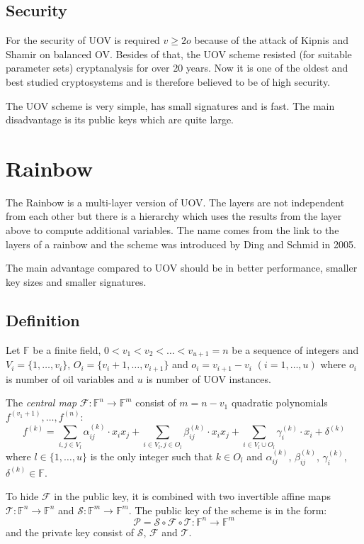 \documentclass[thesis=M,english]{FITthesis}[2019/12/23]
\begin{document}
\subsection{Security}
For the security of UOV is required $v \geq 2o$ because of the attack of Kipnis and Shamir on balanced OV.\cite{L-KS98} Besides of that, the UOV scheme resisted (for suitable parameter sets) cryptanalysis for over 20 years. Now it is one of the oldest and best studied cryptosystems and is therefore believed to be of high security.

The UOV scheme is very simple, has small signatures and is fast. The main disadvantage is its public keys which are quite large.

\newpage
\section{Rainbow}
The Rainbow is a multi-layer version of UOV. The layers are not independent from each other but there is a hierarchy which uses the results from the layer above to compute additional variables. The name comes from the link to the layers of a rainbow and the scheme was introduced by Ding and Schmid in 2005.

The main advantage compared to UOV should be in better performance, smaller key sizes and smaller signatures.

\subsection{Definition}
Let $\mathbb{F}$ be a finite field, $0<v_1<v_2<\ldots<v_{u+1} = n$ be a sequence of integers and $V_i=\{1, \ldots, v_i\}$, $O_i=\{v_i+1, \ldots, v_{i+1}\}$ and $o_i = v_{i+1} - v_i \,\, (i=1,\ldots,u)$ where $o_i$ is number of oil variables and $u$ is number of UOV instances.

\bigskip
\noindent
The \textit{central map} $\mathcal{F}:\mathbb{F}^n \rightarrow \mathbb{F}^m$ consist of $m = n - v_1$ quadratic polynomials $f^{(v_1+1)}, \ldots, f^{(n)}$:
\[
	f^{(k)} = \sum\limits_{i,j \in V_l}{\alpha_{ij}^{(k)} \cdot x_ix_j} +  \sum\limits_{i \in V_l,j \in O_l}{\beta_{ij}^{(k)} \cdot x_ix_j}+ \sum\limits_{i \in V_l \cup O_l}{\gamma_{i}^{(k)} \cdot x_i} + \delta^{(k)}
\]
where $l \in \{1, \ldots, u\}$ is the only integer such that $k \in O_l$ and $\alpha_{ij}^{(k)}$, $\beta_{ij}^{(k)}$, $\gamma_{i}^{(k)}$, $\delta^{(k)} \in \mathbb{F}$.

\bigskip
\noindent
To hide $\mathcal{F}$ in the public key, it is combined with two invertible affine maps $\mathcal{T}: \mathbb{F}^n \rightarrow \mathbb{F}^n$ and $\mathcal{S}: \mathbb{F}^m \rightarrow \mathbb{F}^m$. The public key of the scheme is in the form:
\[
	\mathcal{P} = \mathcal{S} \circ \mathcal{F} \circ \mathcal{T} : \mathbb{F}^n \rightarrow \mathbb{F}^m
\]
and the private key consist of $\mathcal{S}$, $\mathcal{F}$ and $\mathcal{T}$.
\end{document}
